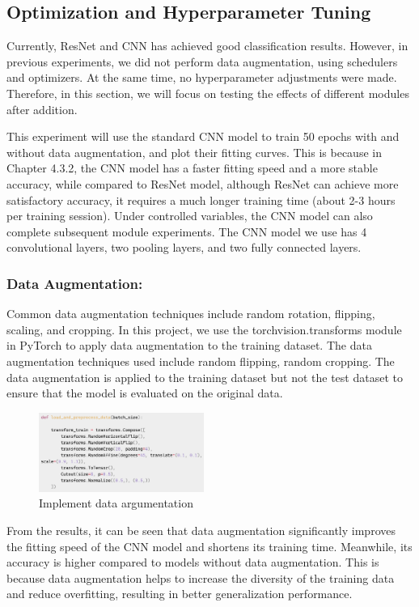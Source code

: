 \documentclass[twocolumn]{article}
\begin{document}
    \subsection{Optimization and Hyperparameter Tuning}
    Currently, ResNet and CNN has achieved good classification results. However, in previous experiments, we did not perform data augmentation, using schedulers and optimizers. At the same time, no hyperparameter adjustments were made. Therefore, in this section, we will focus on testing the effects of different modules after addition.

    This experiment will use the standard CNN model to train 50 epochs with and without data augmentation, and plot their fitting curves. This is because in Chapter 4.3.2, the CNN model has a faster fitting speed and a more stable accuracy, while compared to ResNet model, although ResNet can achieve more satisfactory accuracy, it requires a much longer training time (about 2-3 hours per training session). Under controlled variables, the CNN model can also complete subsequent module experiments. The CNN model we use has 4 convolutional layers, two pooling layers, and two fully connected layers.

    \subsubsection{Data Augmentation:} Common data augmentation techniques include random rotation, flipping, scaling, and cropping. In this project, we use the torchvision.transforms module in PyTorch to apply data augmentation to the training dataset. The data augmentation techniques used include random flipping, random cropping. The data augmentation is applied to the training dataset but not the test dataset to ensure that the model is evaluated on the original data.
    
    \begin{figure}[ht]
        \centering
        \includegraphics[width=0.48\textwidth]{transform.png}
        \caption{Implement data argumentation}
        \label{fig:transform}
    \end{figure}

    From the results, it can be seen that data augmentation significantly improves the fitting speed of the CNN model and shortens its training time. Meanwhile, its accuracy is higher compared to models without data augmentation. This is because data augmentation helps to increase the diversity of the training data and reduce overfitting, resulting in better generalization performance.
\end{document}
